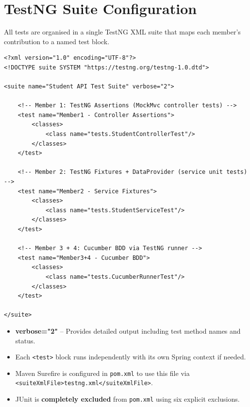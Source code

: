 \documentclass[12pt,a4paper]{article}
\begin{document}
\section{TestNG Suite Configuration}

All tests are organised in a single TestNG XML suite that maps each member's contribution to a named test block.

\begin{lstlisting}[style=xmlstyle, caption={\texttt{testng.xml} -- Test suite definition}]
<?xml version="1.0" encoding="UTF-8"?>
<!DOCTYPE suite SYSTEM "https://testng.org/testng-1.0.dtd">

<suite name="Student API Test Suite" verbose="2">

    <!-- Member 1: TestNG Assertions (MockMvc controller tests) -->
    <test name="Member1 - Controller Assertions">
        <classes>
            <class name="tests.StudentControllerTest"/>
        </classes>
    </test>

    <!-- Member 2: TestNG Fixtures + DataProvider (service unit tests) -->
    <test name="Member2 - Service Fixtures">
        <classes>
            <class name="tests.StudentServiceTest"/>
        </classes>
    </test>

    <!-- Member 3 + 4: Cucumber BDD via TestNG runner -->
    <test name="Member3+4 - Cucumber BDD">
        <classes>
            <class name="tests.CucumberRunnerTest"/>
        </classes>
    </test>

</suite>
\end{lstlisting}

\begin{tcolorbox}[noteboxstyle, title=Key Configuration Notes]
\begin{itemize}[nosep]
    \item \textbf{verbose="2"} -- Provides detailed output including test method names and status.
    \item Each \texttt{<test>} block runs independently with its own Spring context if needed.
    \item Maven Surefire is configured in \texttt{pom.xml} to use this file via\\
    \texttt{<suiteXmlFile>testng.xml</suiteXmlFile>}.
    \item JUnit is \textbf{completely excluded} from \texttt{pom.xml} using six explicit exclusions.
\end{itemize}
\end{tcolorbox}
\end{document}
